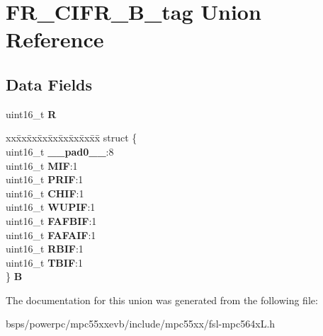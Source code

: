\hypertarget{unionFR__CIFR__16B__tag}{}\section{F\+R\+\_\+\+C\+I\+F\+R\+\_\+B\+\_\+tag Union Reference}
\label{unionFR__CIFR__16B__tag}
\subsection*{Data Fields}
\begin{DoxyCompactItemize}
\item 
\mbox{\label{unionFR__CIFR__16B__tag_a5e6902c38b0afb09f3d47ca2f6d95be0}} 
uint16\+\_\+t {\bfseries R}
\item 
\mbox{\label{unionFR__CIFR__16B__tag_a4422dc9765f07d2d2c8b0122fcd3796b}} 
\begin{tabbing}
xx\=xx\=xx\=xx\=xx\=xx\=xx\=xx\=xx\=\kill
struct \{\\
\>uint16\_t {\bfseries \_\_pad0\_\_}:8\\
\>uint16\_t {\bfseries MIF}:1\\
\>uint16\_t {\bfseries PRIF}:1\\
\>uint16\_t {\bfseries CHIF}:1\\
\>uint16\_t {\bfseries WUPIF}:1\\
\>uint16\_t {\bfseries FAFBIF}:1\\
\>uint16\_t {\bfseries FAFAIF}:1\\
\>uint16\_t {\bfseries RBIF}:1\\
\>uint16\_t {\bfseries TBIF}:1\\
\} {\bfseries B}\\

\end{tabbing}\end{DoxyCompactItemize}


The documentation for this union was generated from the following file\+:\begin{DoxyCompactItemize}
\item 
bsps/powerpc/mpc55xxevb/include/mpc55xx/fsl-\/mpc564x\+L.\+h\end{DoxyCompactItemize}
